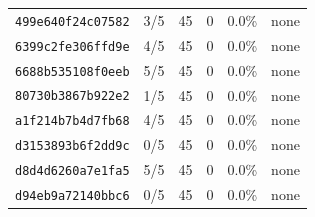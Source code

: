 \begin{tabular}{llrrrl}
\texttt{499e640f24c07582} & 3/5 & 45 & 0 & 0.0\% & none \\
\texttt{6399c2fe306ffd9e} & 4/5 & 45 & 0 & 0.0\% & none \\
\texttt{6688b535108f0eeb} & 5/5 & 45 & 0 & 0.0\% & none \\
\texttt{80730b3867b922e2} & 1/5 & 45 & 0 & 0.0\% & none \\
\texttt{a1f214b7b4d7fb68} & 4/5 & 45 & 0 & 0.0\% & none \\
\texttt{d3153893b6f2dd9c} & 0/5 & 45 & 0 & 0.0\% & none \\
\texttt{d8d4d6260a7e1fa5} & 5/5 & 45 & 0 & 0.0\% & none \\
\texttt{d94eb9a72140bbc6} & 0/5 & 45 & 0 & 0.0\% & none \\
\bottomrule
\end{tabular}
